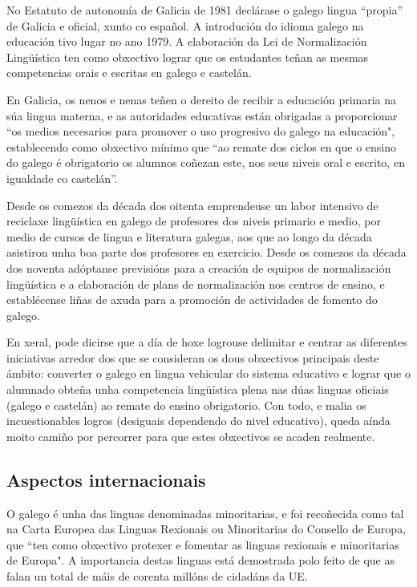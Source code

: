 \begin{multicols}{2}
No Estatuto de autonomía de Galicia de 1981 declárase o galego lingua “propia” de Galicia e oficial, xunto co español. A introdución do idioma galego na educación tivo lugar no ano 1979. A elaboración da Lei de Normalización Lingüística ten como obxectivo lograr que os estudantes teñan as mesmas competencias orais e escritas en galego e castelán. 

En Galicia, os nenos e nenas teñen o dereito de recibir a educación primaria na súa lingua materna, e as autoridades educativas están obrigadas a proporcionar “os medios necesarios para promover o uso progresivo do galego na educación", establecendo como obxectivo mínimo que “ao remate dos ciclos en que o ensino do galego é obrigatorio os alumnos coñezan este, nos seus niveis oral e escrito, en igualdade co castelán”. 

Desde os comezos da década dos oitenta emprendeuse un labor intensivo de reciclaxe lingüística en galego de profesores dos niveis primario e medio, por medio de cursos de lingua e literatura galegas, aos que ao longo da década asistiron unha boa parte dos profesores en exercicio. Desde os comezos da década dos noventa adóptanse previsións para a creación de equipos de normalización lingüística e a elaboración de plans de normalización nos centros de ensino, e establécense liñas de axuda para a promoción de actividades de fomento do galego.

En xeral, pode dicirse que a día de hoxe logrouse delimitar e centrar as diferentes iniciativas arredor dos que se consideran os dous obxectivos principais deste ámbito: converter o galego en lingua vehicular do sistema educativo e lograr que o alumnado obteña unha competencia lingüística plena nas dúas linguas oficiais (galego e castelán) ao remate do ensino obrigatorio. Con todo, e malia os incuestionables logros (desiguais dependendo do nivel educativo), queda aínda moito camiño por percorrer para que estes obxectivos se acaden realmente.


\subsection{Aspectos internacionais}

    O galego é unha das linguas denominadas minoritarias, e foi recoñecida como tal na Carta Europea das Linguas Rexionais ou Minoritarias do Consello de Europa, que “ten como obxectivo protexer e fomentar as linguas rexionais e minoritarias de Europa". A importancia destas linguas está demostrada polo feito de que as falan un total de máis de corenta millóns de cidadáns da UE.


\end{multicols}
